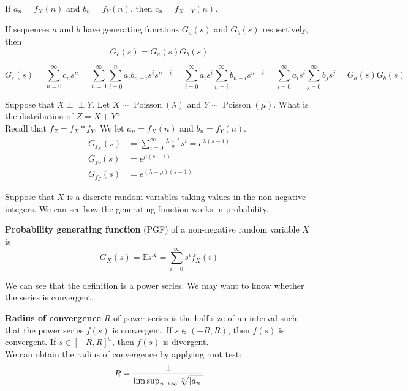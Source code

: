 \documentclass{huhtakm-template-book}
\newcommand{\independent}{\perp\!\!\!\perp}
\newcommand{\expect}{\mathbb{E}}
\DeclareMathOperator{\Poisson}{Poisson}
\begin{document}
\begin{eg}
    If $a_{n}=f_{X}(n)$ and $b_{n}=f_{Y}(n)$, then $c_{n}=f_{X+Y}(n)$.
\end{eg}
\begin{cla}
    If sequences $a$ and $b$ have generating functions $G_{a}(s)$ and $G_{b}(s)$ respectively, then
    \begin{equation*}
        G_{c}(s)=G_{a}(s)G_{b}(s)
    \end{equation*}
\end{cla}
\begin{proofing}
    \begin{equation*}
        G_{c}(s)=\sum_{n=0}^{\infty}c_{n}s^{n}=\sum_{n=0}^{\infty}\sum_{i=0}^{n}a_{i}b_{n-i}s^{i}s^{n-i}=\sum_{i=0}^{\infty}a_{i}s^{i}\sum_{n=i}^{\infty}b_{n-i}s^{n-i}=\sum_{i=0}^{\infty}a_{i}s^{i}\sum_{j=0}^{\infty}b_{j}s^{j}=G_{a}(s)G_{b}(s)
    \end{equation*}
\end{proofing}
\begin{eg}
    \label{Two independent poisson PGF}
    Suppose that $X\independent Y$. Let $X\sim\Poisson(\lambda)$ and $Y\sim\Poisson(\mu)$. What is the distribution of $Z=X+Y$?\\
    Recall that $f_{Z}=f_{X}*f_{Y}$. We let $a_{n}=f_{X}(n)$ and $b_{n}=f_{Y}(n)$.
    \begin{align*}
        G_{f_{X}}(s)&=\sum_{i=0}^{\infty}\frac{\lambda^{i}e^{-\lambda}}{i!}s^{i}=e^{\lambda(s-1)}\\
        G_{f_{Y}}(s)&=e^{\mu(s-1)}\\
        G_{f_{Z}}(s)&=e^{(\lambda+\mu)(s-1)}
    \end{align*}
\end{eg}
Suppose that $X$ is a discrete random variables taking values in the non-negative integers. We can see how the generating function works in probability.
\begin{defn}
    \textbf{Probability generating function} (PGF) of a non-negative random variable $X$ is
    \begin{equation*}
        G_{X}(s)=\expect s^{X}=\sum_{i=0}^{\infty}s^{i}f_{X}(i)
    \end{equation*}
\end{defn}
We can see that the definition is a power series. We may want to know whether the series is convergent.
\begin{defn}
    \textbf{Radius of convergence} $R$ of power series is the half size of an interval such that the power series $f(s)$ is convergent. If $s\in(-R,R)$, then $f(s)$ is convergent. If $s\in[-R,R]^{\complement}$, then $f(s)$ is divergent.\\
    We can obtain the radius of convergence by applying root test:
    \begin{equation*}
        R=\frac{1}{\limsup_{n\to\infty}\sqrt[n]{\left|{a_{n}}\right|}}
    \end{equation*}
\end{defn}
\end{document}
